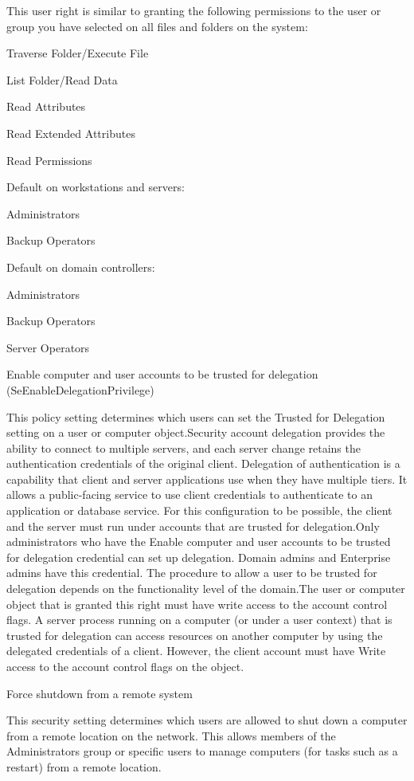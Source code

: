 This user right is similar to granting the following permissions to the user or group you have selected on all files and folders on the system:

Traverse Folder/Execute File

List Folder/Read Data

Read Attributes

Read Extended Attributes

Read Permissions

Default on workstations and servers:

Administrators

Backup Operators

Default on domain controllers:

Administrators

Backup Operators

Server Operators

Enable computer and user accounts to be trusted for delegation (SeEnableDelegationPrivilege)

This policy setting determines which users can set the Trusted for Delegation setting on a user or computer object.Security account delegation provides the ability to connect to multiple servers, and each server change retains the authentication credentials of the original client. Delegation of authentication is a capability that client and server applications use when they have multiple tiers. It allows a public-facing service to use client credentials to authenticate to an application or database service. For this configuration to be possible, the client and the server must run under accounts that are trusted for delegation.Only administrators who have the Enable computer and user accounts to be trusted for delegation credential can set up delegation. Domain admins and Enterprise admins have this credential. The procedure to allow a user to be trusted for delegation depends on the functionality level of the domain.The user or computer object that is granted this right must have write access to the account control flags. A server process running on a computer (or under a user context) that is trusted for delegation can access resources on another computer by using the delegated credentials of a client. However, the client account must have Write access to the account control flags on the object.

Force shutdown from a remote system

This security setting determines which users are allowed to shut down a computer from a remote location on the network. This allows members of the Administrators group or specific users to manage computers (for tasks such as a restart) from a remote location.

